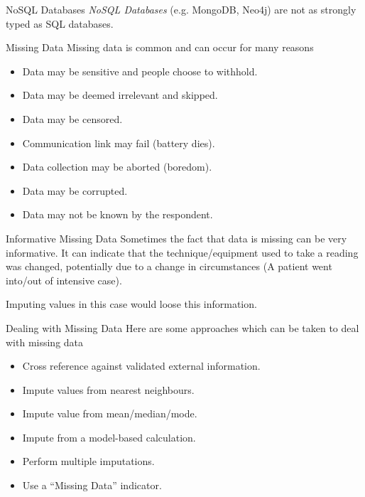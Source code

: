 \documentclass[11pt,a4paper]{article}
\begin{document}
  \begin{remark}{NoSQL Databases}
    \textit{NoSQL Databases} (e.g. MongoDB, Neo4j) are not as strongly typed as SQL databases.
  \end{remark}

  \begin{remark}{Missing Data}
    Missing data is common and can occur for many reasons
    \begin{itemize}
      \item Data may be sensitive and people choose to withhold.
      \item Data may be deemed irrelevant and skipped.
      \item Data may be censored.
      \item Communication link may fail (battery dies).
      \item Data collection may be aborted (boredom).
      \item Data may be corrupted.
      \item Data may not be known by the respondent.
    \end{itemize}
  \end{remark}

  \begin{remark}{Informative Missing Data}
    Sometimes the fact that data is missing can be very informative. It can indicate that the technique/equipment used to take a reading was changed, potentially due to a change in circumstances (A patient went into/out of intensive case).
    \par Imputing values in this case would loose this information.

  \end{remark}

  \begin{remark}{Dealing with Missing Data}
    Here are some approaches which can be taken to deal with missing data
    \begin{itemize}
      \item Cross reference against validated external information.
      \item Impute values from nearest neighbours.
      \item Impute value from mean/median/mode.
      \item Impute from a model-based calculation.
      \item Perform multiple imputations.
      \item Use a ``Missing Data'' indicator.
    \end{itemize}
  \end{remark}
\end{document}
